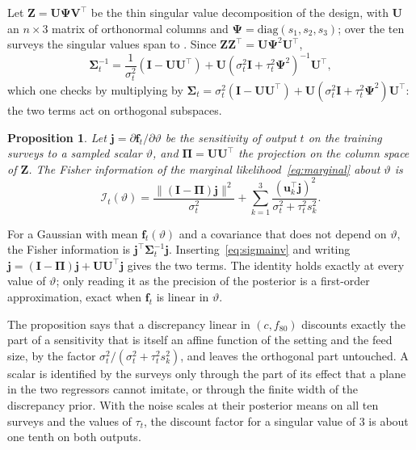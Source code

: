 \documentclass[journal]{IEEEtran}
\newtheorem{proposition}{Proposition}
\begin{document}
Let $\mathbf Z=\mathbf U\boldsymbol\Psi\mathbf V^{\top}$ be the thin singular value decomposition of the design, with
$\mathbf U$ an $n\times3$ matrix of orthonormal columns and $\boldsymbol\Psi=\mathrm{diag}(s_1,s_2,s_3)$; over the ten surveys
the singular values span \thSvMin{} to \thSvMax. Since $\mathbf Z\mathbf Z^{\top}=\mathbf U\boldsymbol\Psi^2\mathbf U^{\top}$,
\begin{equation}
\boldsymbol\Sigma_t^{-1}=\frac{1}{\sigma_t^2}\left(\mathbf I-\mathbf U\mathbf U^{\top}\right)+\mathbf U\left(\sigma_t^2\mathbf I+\tau_t^2\boldsymbol\Psi^2\right)^{-1}\mathbf U^{\top},
\label{eq:sigmainv}
\end{equation}
which one checks by multiplying by $\boldsymbol\Sigma_t=\sigma_t^2(\mathbf I-\mathbf U\mathbf U^{\top})+\mathbf
U(\sigma_t^2\mathbf I+\tau_t^2\boldsymbol\Psi^2)\mathbf U^{\top}$: the two terms act on orthogonal subspaces.

\begin{proposition}\label{prop:info}
Let $\mathbf j=\partial\mathbf f_t/\partial\vartheta$ be the sensitivity of output $t$ on the training surveys to a sampled
scalar $\vartheta$, and $\boldsymbol\Pi=\mathbf U\mathbf U^{\top}$ the projection on the column space of $\mathbf Z$. The Fisher
information of the marginal likelihood~\eqref{eq:marginal} about $\vartheta$ is
\begin{equation}
\mathcal I_t(\vartheta)=\frac{\|(\mathbf I-\boldsymbol\Pi)\mathbf j\|^2}{\sigma_t^2}+\sum_{k=1}^{3}\frac{(\mathbf u_k^{\top}\mathbf j)^2}{\sigma_t^2+\tau_t^2s_k^2}.
\label{eq:fisher}
\end{equation}
\end{proposition}
\begin{IEEEproof}
For a Gaussian with mean $\mathbf f_t(\vartheta)$ and a covariance that does not depend on $\vartheta$, the Fisher information is
$\mathbf j^{\top}\boldsymbol\Sigma_t^{-1}\mathbf j$. Inserting~\eqref{eq:sigmainv} and writing $\mathbf
j=(\mathbf I-\boldsymbol\Pi)\mathbf j+\mathbf U\mathbf U^{\top}\mathbf j$ gives the two terms. The identity holds exactly at every value of $\vartheta$; only reading it as the precision of the
posterior is a first-order approximation, exact when $\mathbf f_t$ is linear in $\vartheta$.
\end{IEEEproof}

The proposition says that a discrepancy linear in $(c,f_{80})$ discounts exactly the part of a sensitivity that is
itself an affine function of the setting and the feed size, by the factor $\sigma_t^2/(\sigma_t^2+\tau_t^2s_k^2)$, and leaves
the orthogonal part untouched. A scalar is identified by the surveys only through the part of its effect that a plane in
the two regressors cannot imitate, or through the finite width of the discrepancy prior. With the noise scales at their
posterior means on all ten surveys and the values of $\tau_t$, the discount factor for a singular value of 3 is about one
tenth on both outputs.
\end{document}

